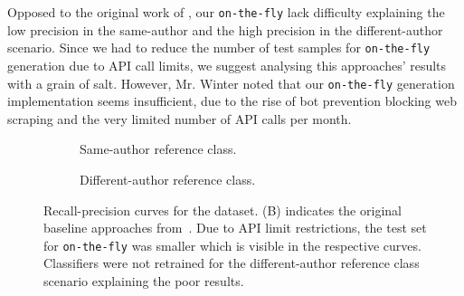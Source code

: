 Opposed to the original work of \citet{koppel_determining_2014}, our \texttt{on-the-fly} \imps{} lack difficulty explaining the low precision in the same-author and the high precision in the different-author scenario.
Since we had to reduce the number of test samples for \texttt{on-the-fly} \imp{} generation due to API call limits, we suggest analysing this approaches' results with a grain of salt.
However, Mr. Winter noted that our \texttt{on-the-fly} \imp{} generation implementation seems insufficient, due to the rise of bot prevention blocking web scraping and the very limited number of API calls per month.

\begin{figure}[htbp]
  \centering
  \begin{subfigure}[b]{0.49\textwidth}
    \centering
    
    \caption{Same-author reference class. }
    \label{fig:blog_same_author}
  \end{subfigure}
  \hfill
  \begin{subfigure}[b]{0.49\textwidth}
    \centering
    
    \caption{Different-author reference class.}
    \label{fig:blog_diff_author}
  \end{subfigure}
  \caption[Recall-precision curves for the \dataBlog{} dataset. ]{Recall-precision curves for the \dataBlog{} dataset. 
  (B) indicates the original baseline approaches from~\citep{koppel_determining_2014}.
  Due to API limit restrictions, the test set for \texttt{on-the-fly} was smaller which is visible in the respective curves.
  Classifiers were not retrained for the different-author reference class scenario explaining the poor results.}
  \label{fig:diff_imp_gen_blog}
\end{figure}

